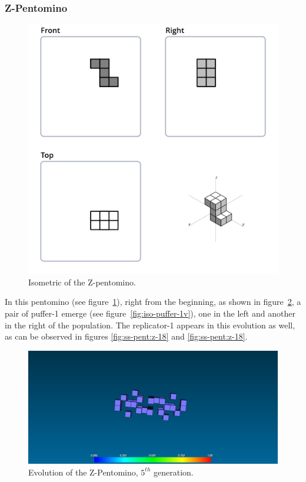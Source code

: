 \subsubsection{Z-Pentomino}
\label{sec:z-pentomino}

\begin{figure}[H]
	\centering
	\includegraphics[scale=0.3]{iso_diagrams/z.png}
	\caption{Isometric of the Z-pentomino.}
	\label{fig:iso-pent-z}
\end{figure}

In this pentomino (see figure~\ref{fig:iso-pent-z}), right from the beginning,
as shown in figure~\ref{fig:ss-pent:z-5}, a pair of puffer-1 emerge (see
figure~\ref{fig:iso-puffer-1v}), one in the left and another in the right of the
population. The replicator-1 appears in this evolution as well, as can be
observed in figures \ref{fig:ss-pent:z-18} and \ref{fig:ss-pent:z-18}.

\begin{figure}[H]
	\centering
	\includegraphics[scale=0.3]{pentominoes_ss/z_5.png}
	\caption{Evolution of the Z-Pentomino, $5^{th}$ generation.}
	\label{fig:ss-pent:z-5}
\end{figure}

